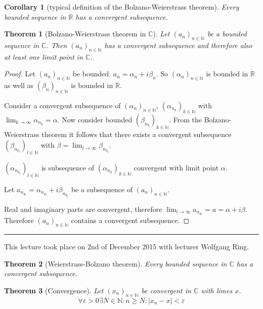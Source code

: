 \documentclass[a4paper,landscape,twocolumn]{article}
\newtheorem{theorem}{Theorem}
\newtheorem{cor}{Corollary}
\newcommand\abs[1]{\left|#1\right|}
\newcommand\seq[1]{{\left(#1\right)}_{n \in \mathbb N}}
\newcommand\meta[3]{\hrule{} This #1 took place on #2 with lecturer #3.\par}
\begin{document}
\begin{cor}[typical definition of the Bolzano-Weierstrass theorem]
  Every bounded sequence in $\mathbb R$ has a convergent subsequence.
\end{cor}

\begin{theorem}[Bolzano-Weierstrass theorem in $\mathbb C$]
  Let $\seq{a_n}$ be a bounded sequence in $\mathbb C$.
  Then $\seq{a_n}$ has a convergent subsequence and
  therefore also at least one limit point in $\mathbb C$.
\end{theorem}
\begin{proof}
  Let $\seq{a_n}$ be bounded. $a_n = \alpha_n + i \beta_n$.
  So $\seq{\alpha_n}$ is bounded in $\mathbb R$ as well as
  $\seq{\beta_n}$ is bounded in $\mathbb R$.

  Consider a convergent subsequence of $\seq{\alpha_n}$,
  $\left(\alpha_{n_k}\right)_{k \in \mathbb N}$ with
  $\lim_{k\to\infty} \alpha_{n_k} = \alpha$.
  Now consider bounded $\left(\beta_{n_k}\right)_{k \in \mathbb N}$.
  From the Bolzano-Weierstrass theorem it follows that there
  exists a convergent subsequence $\left(\beta_{n_{k_l}}\right)_{l \in \mathbb N}$
  with $\beta = \lim_{l\to\infty} \beta_{n_{k_l}}$.

  $\left(\alpha_{n_{k_l}}\right)_{l \in \mathbb N}$ is subsequence of
  $\left(\alpha_{n_k}\right)_{k \in \mathbb N}$
  convergent with limit point $\alpha$.

  Let $a_{n_{k_l}} = \alpha_{n_{k_l}} + i \beta_{n_{k_l}}$
  be a subsequence of $(a_n)_{n\in\mathbb N}$.

  Real and imaginary parts are convergent, therefore $\lim_{l\to\infty} a_{n_{k_l}} = a = \alpha + i \beta$.
  Therefore $\seq{a_n}$ contains a convergent subsequence.
\end{proof}

\meta{lecture}{2nd of December 2015}{Wolfgang Ring}
\begin{theorem}[Weierstrass-Bolzano theorem]
  Every bounded sequence in $\mathbb C$ has a convergent subsequence.
\end{theorem}

\begin{theorem}[Convergence]
  Let $(x_n)_{n \in \mathbb N}$ be convergent in $\mathbb C$ with limes $x$.
  \[ \forall \varepsilon > 0 \exists N \in \mathbb N: n \geq N: \abs{x_n - x} < \varepsilon \]
\end{theorem}
\end{document}
